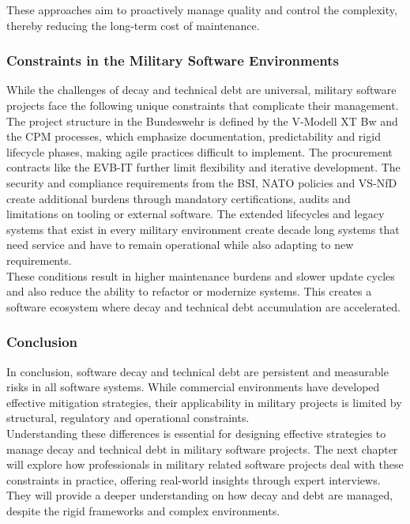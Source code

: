 These approaches aim to proactively manage quality and control the complexity, thereby reducing the long-term cost of maintenance. 

\subsubsection{Constraints in the Military Software Environments}
While the challenges of decay and technical debt are universal, military software projects face the following unique constraints that complicate their management.\\

The project structure in the Bundeswehr is defined by the V-Modell XT Bw and the \ac{CPM} processes, which emphasize documentation, predictability and rigid lifecycle phases, making agile practices difficult to implement.
The procurement contracts like the \ac{EVB-IT} further limit flexibility and iterative development. The security and compliance requirements from the BSI, NATO policies and VS-NfD create additional burdens through mandatory certifications, audits and limitations on tooling or external software.
The extended lifecycles and legacy systems that exist in every military environment create decade long systems that need service and have to remain operational while also adapting to new requirements.\\

These conditions result in higher maintenance burdens and slower update cycles and also reduce the ability to refactor or modernize systems. This creates a software ecosystem where decay and technical debt accumulation are accelerated.\\

\subsubsection{Conclusion}
In conclusion, software decay and technical debt are persistent and measurable risks in all software systems. While commercial environments have developed effective mitigation strategies, their applicability in military projects is limited by structural, regulatory and operational constraints.\\

Understanding these differences is essential for designing effective strategies to manage decay and technical debt in military software projects. The next chapter will explore how professionals in military related software projects deal with these constraints in practice, offering real-world
insights through expert interviews. They will provide a deeper understanding on how decay and debt are managed, despite the rigid frameworks and complex environments.

